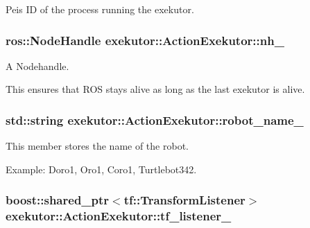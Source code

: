 \-Peis \-I\-D of the process running the exekutor. 

\hypertarget{classexekutor_1_1ActionExekutor_a1f0541608c4f27f3c72ab22b1874c882}{
\subsubsection[{nh\-\_\-}]{\setlength{\rightskip}{0pt plus 5cm}ros\-::\-Node\-Handle {\bf exekutor\-::\-Action\-Exekutor\-::nh\-\_\-}}}\label{classexekutor_1_1ActionExekutor_a1f0541608c4f27f3c72ab22b1874c882}


\-A \-Nodehandle. 

\-This ensures that \-R\-O\-S stays alive as long as the last exekutor is alive. \hypertarget{classexekutor_1_1ActionExekutor_af165894bbbbabd62c17be857be095936}{
\subsubsection[{robot\-\_\-name\-\_\-}]{\setlength{\rightskip}{0pt plus 5cm}std\-::string {\bf exekutor\-::\-Action\-Exekutor\-::robot\-\_\-name\-\_\-}}}\label{classexekutor_1_1ActionExekutor_af165894bbbbabd62c17be857be095936}


\-This member stores the name of the robot. 

\-Example\-: \-Doro1, \-Oro1, \-Coro1, \-Turtlebot342. \hypertarget{classexekutor_1_1ActionExekutor_ae518bc34ee6123c118ba940fd1959f65}{
\subsubsection[{tf\-\_\-listener\-\_\-}]{\setlength{\rightskip}{0pt plus 5cm}boost\-::shared\-\_\-ptr$<$tf\-::\-Transform\-Listener$>$ {\bf exekutor\-::\-Action\-Exekutor\-::tf\-\_\-listener\-\_\-}}}\label{classexekutor_1_1ActionExekutor_ae518bc34ee6123c118ba940fd1959f65}


